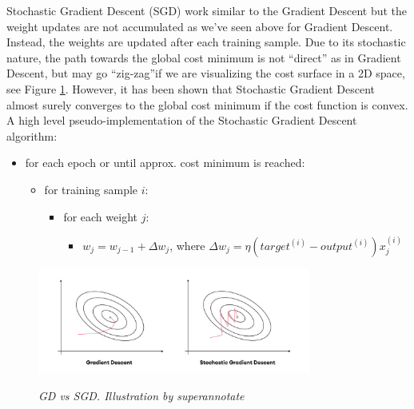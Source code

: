 Stochastic Gradient Descent (SGD) work similar to the Gradient Descent but the weight
updates are not accumulated as we’ve seen above for Gradient Descent. Instead,
the weights are updated after each training sample. Due to its stochastic
nature, the path towards the global cost minimum is not “direct” as in Gradient
Descent, but may go “zig-zag”if we are visualizing the cost surface in a 2D
space, see Figure \ref{fig:sgdvsgd}. However, it has been shown that
Stochastic Gradient Descent almost surely converges to the global cost minimum
if the cost function is convex. \\

A high level pseudo-implementation of the Stochastic Gradient Descent
algorithm:

\begin{itemize}[label=$\circ$]
  \item for each epoch or until approx. cost minimum is reached:
    \begin{itemize}[label=$\circ$, topsep=0pt]
      \item for training sample \(i\):
        \begin{itemize}[label=$\circ$, topsep=5pt]
          \item for each weight \(j\):
            \begin{itemize}[label=$\circ$, topsep=10pt]
              \item \(w_j = w_{j-1} + \Delta w_j\), where \(\Delta w_j = \eta (target^{(i)} - output^{(i)})x_{j}^{(i)}\)
            \end{itemize}
        \end{itemize}
    \end{itemize}
\end{itemize}

\begin{figure}[H]
  \centering
    \includegraphics[width=0.8\textwidth]{imatges/preliminaries/sgdvsgd.jpeg}
  \caption[GD vs SGD]{\textit{GD vs SGD. Illustration by superannotate}}
  {\label{fig:sgdvsgd}}
\end{figure}

